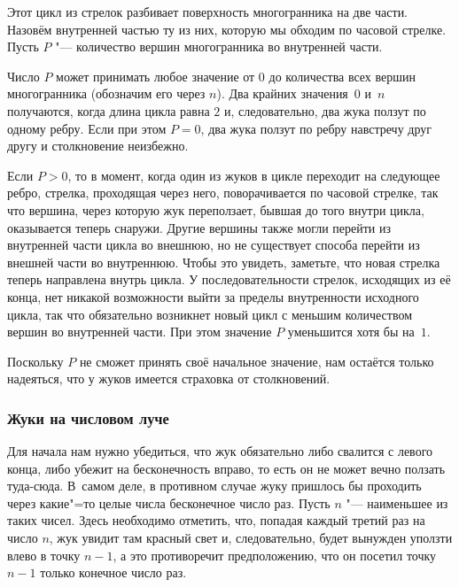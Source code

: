 \documentclass[twoside]{book}
\begin{document}
Этот цикл из стрелок разбивает поверхность многогранника на две части.
Назовём внутренней частью ту из них, которую мы обходим по часовой стрелке.
Пусть $P$ "--- количество вершин многогранника во внутренней части.

Число $P$ может принимать любое значение от $0$ до количества всех
вершин многогранника (обозначим его через $n$).
Два крайних значения~$0$ и~$n$ получаются, когда длина цикла равна $2$ и, следовательно, два жука ползут по одному ребру.
Если при этом $P=0$, два жука ползут по ребру навстречу друг другу и столкновение не\-из\-бежно.

Если $P>0$, то в момент, когда один из жуков в цикле переходит на следующее ребро,
стрелка, проходящая через него, поворачивается по часовой стрелке, так
что
вершина, через которую жук переползает, бывшая до того внутри цикла, оказывается теперь снаружи.
Другие вершины также могли перейти из внутренней части цикла во внешнюю, но не существует способа перейти из внешней части во внутреннюю.
Чтобы это увидеть, заметьте, что новая стрелка теперь направлена внутрь цикла.
У последовательности стрелок, исходящих из её конца, нет никакой
возможности выйти за пределы внутренности исходного цикла, так что
обязательно возникнет новый цикл с меньшим количеством вершин во внутренней части.
При этом значение $P$ уменьшится хотя бы на~$1$.
{\par}

Поскольку $P$ не сможет принять своё начальное значение, нам остаётся только надеяться, что у жуков имеется страховка от столкновений.
\heart


\subsubsection*{Жуки на числовом луче}%

Для начала нам нужно убедиться, что жук обязательно либо свалится с левого конца, либо убежит на бесконечность вправо, то есть он не может вечно ползать туда-сюда.
В~самом деле, в противном случае жуку пришлось бы проходить через
какие"=то целые числа бесконечное число раз.
Пусть $n$ "--- наименьшее из таких чисел.
Здесь необходимо отметить, что, попадая каждый третий раз на число
$n$, жук увидит там красный свет и, следовательно, будет вынужден
уползти влево в точку $n-1$, а это противоречит предположению, что он
посетил точку $n-1$ только конечное число раз.
\end{document}
